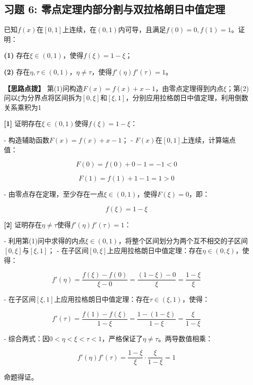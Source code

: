 \documentclass[11pt,a4paper,UTF8]{ctexart}
\begin{document}
\subsection{习题 6: 零点定理内部分割与双拉格朗日中值定理}

已知$f(x)$在$[0, 1]$上连续，在$(0, 1)$内可导，且满足$f(0) = 0, f(1) = 1$。证明：

\textbf{(1)}  存在$\xi \in (0, 1)$，使得$f(\xi) = 1 - \xi$；

\textbf{(2)}  存在$\eta, \tau \in (0, 1)$，$\eta \neq \tau$，使得$f'(\eta)f'(\tau) = 1$。

\textbf{\color{DeepPurple}【思路点拨】} 第(1)问构造$F(x) = f(x) + x - 1$，由零点定理得到内点$\xi$；第(2)问以$\xi$为分界点将区间拆为$[0, \xi]$和$[\xi, 1]$，分别应用拉格朗日中值定理，利用倒数关系乘积为1


\begin{solbox}[分步推导与答题规范]
\textbf{[1]} 证明存在$\xi \in (0, 1)$使得$f(\xi) = 1 - \xi$：

- 构造辅助函数$F(x) = f(x) + x - 1$；
- $F(x)$在$[0, 1]$上连续，计算端点值：

 
\begin{equation*}
F(0) = f(0) + 0 - 1 = -1 < 0
\end{equation*}

 
\begin{equation*}
F(1) = f(1) + 1 - 1 = 1 > 0
\end{equation*}


- 由零点存在定理，至少存在一点$\xi \in (0, 1)$，使得$F(\xi) = 0$，即：

 
\begin{equation*}
f(\xi) = 1 - \xi
\end{equation*}


\textbf{[2]} 证明存在$\eta \neq \tau$使得$f'(\eta)f'(\tau) = 1$：

- 利用第(1)问中求得的内点$\xi \in (0, 1)$，将整个区间划分为两个互不相交的子区间$[0, \xi]$与$[\xi, 1]$；
- 在子区间$[0, \xi]$上应用拉格朗日中值定理：存在$\eta \in (0, \xi)$，使得：

 
\begin{equation*}
f'(\eta) = \frac{f(\xi) - f(0)}{\xi - 0} = \frac{(1 - \xi) - 0}{\xi} = \frac{1 - \xi}{\xi}
\end{equation*}


- 在子区间$[\xi, 1]$上应用拉格朗日中值定理：存在$\tau \in (\xi, 1)$，使得：

 
\begin{equation*}
f'(\tau) = \frac{f(1) - f(\xi)}{1 - \xi} = \frac{1 - (1 - \xi)}{1 - \xi} = \frac{\xi}{1 - \xi}
\end{equation*}


- 综合两式：因$0 < \eta < \xi < \tau < 1$，严格保证了$\eta \neq \tau$。两导数值相乘：

 
\begin{equation*}
f'(\eta)f'(\tau) = \frac{1 - \xi}{\xi} \cdot \frac{\xi}{1 - \xi} = 1
\end{equation*}


命题得证。
\end{solbox}
\end{document}
